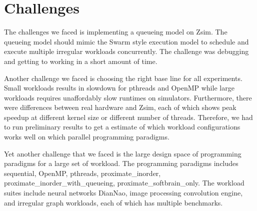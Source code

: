 \section{Challenges} \label{sec:chal}
The challenges we faced is implementing a queueing model on Zsim. 
The queueing model should mimic the Swarm style execution model 
to schedule and execute multiple irregular workloads concurrently. 
The challenge was debugging and getting to working in a short amount of time. 

Another challenge we faced is choosing the right base line for all 
experiments. Small workloads results in slowdown for pthreads and 
OpenMP while large workloads requires unaffordably slow runtimes on simulators. 
Furthermore, there were differences between real hardware and Zsim, 
each of which shows peak speedup at different kernel size or different number of threads. 
Therefore, we had to run preliminary results to get a estimate of which workload 
configurations works well on which parallel programming paradigms.

Yet another challenge that we faced is the large design space of 
programming paradigms for a large set of workload. The programming 
paradigms includes sequential, OpenMP, pthreads, proximate\_inorder, 
proximate\_inorder\_with\_queueing, proximate\_softbrain\_only. The workload suites include
neural networks DianNao, image processing convolution engine, and 
irregular graph workloads, each of which has multiple benchmarks. 
